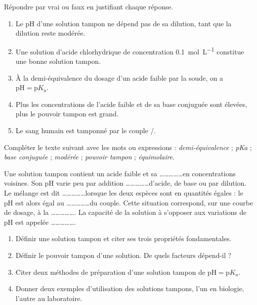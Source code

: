 \documentclass[11pt]{article}
\begin{document}
\begin{exercice}
Répondre par vrai ou faux en justifiant chaque réponse.
\begin{enumerate}
  \item Le pH d'une solution tampon ne dépend pas de sa dilution, tant que la dilution reste modérée.
  \item Une solution d'acide chlorhydrique de concentration \SI{0,1}{mol.L^{-1}} constitue une bonne solution tampon.
  \item À la demi-équivalence du dosage d'un acide faible par la soude, on a $\mathrm{pH} = \mathrm{p}K_a$.
  \item Plus les concentrations de l'acide faible et de sa base conjuguée sont élevées, plus le pouvoir tampon est grand.
  \item Le sang humain est tamponné par le couple /.
\end{enumerate}
\end{exercice}

\begin{exercice}
Compléter le texte suivant avec les mots ou expressions : \emph{demi-équivalence} ; \emph{pKa} ; \emph{base conjuguée} ; \emph{modérée} ; \emph{pouvoir tampon} ; \emph{équimolaire}.

Une solution tampon contient un acide faible et sa \ldots\ldots\ldots\ldots\ldots en concentrations voisines. Son pH varie peu par addition \ldots\ldots\ldots\ldots\ldots d'acide, de base ou par dilution. Le mélange est dit \ldots\ldots\ldots\ldots\ldots lorsque les deux espèces sont en quantités égales : le pH est alors égal au \ldots\ldots\ldots\ldots\ldots du couple. Cette situation correspond, sur une courbe de dosage, à la \ldots\ldots\ldots\ldots\ldots. La capacité de la solution à s'opposer aux variations de pH est appelée \ldots\ldots\ldots\ldots\ldots.
\end{exercice}

\begin{exercice}[Définitions]
\begin{enumerate}
  \item Définir une solution tampon et citer ses trois propriétés fondamentales.
  \item Définir le pouvoir tampon d'une solution. De quels facteurs dépend-il ?
  \item Citer deux méthodes de préparation d'une solution tampon de $\mathrm{pH} = \mathrm{p}K_a$.
  \item Donner deux exemples d'utilisation des solutions tampons, l'un en biologie, l'autre au laboratoire.
\end{enumerate}
\end{exercice}
\end{document}
